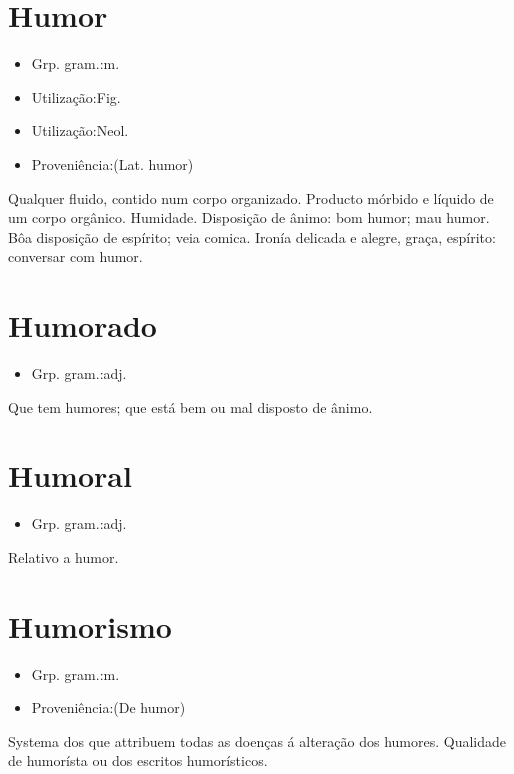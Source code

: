 \documentclass{article}
\begin{document}
\section{Humor}
\begin{itemize}
\item {Grp. gram.:m.}
\end{itemize}
\begin{itemize}
\item {Utilização:Fig.}
\end{itemize}
\begin{itemize}
\item {Utilização:Neol.}
\end{itemize}
\begin{itemize}
\item {Proveniência:(Lat. \textunderscore humor\textunderscore )}
\end{itemize}
Qualquer fluido, contido num corpo organizado.
Producto mórbido e líquido de um corpo orgânico.
Humidade.
Disposição de ânimo: \textunderscore bom humor\textunderscore ; \textunderscore mau humor\textunderscore .
Bôa disposição de espírito; veia comica.
Ironía delicada e alegre, graça, espírito: \textunderscore conversar com humor\textunderscore .
\section{Humorado}
\begin{itemize}
\item {Grp. gram.:adj.}
\end{itemize}
Que tem humores; que está bem ou mal disposto de ânimo.
\section{Humoral}
\begin{itemize}
\item {Grp. gram.:adj.}
\end{itemize}
Relativo a humor.
\section{Humorismo}
\begin{itemize}
\item {Grp. gram.:m.}
\end{itemize}
\begin{itemize}
\item {Proveniência:(De \textunderscore humor\textunderscore )}
\end{itemize}
Systema dos que attribuem todas as doenças á alteração dos humores.
Qualidade de humorísta ou dos escritos humorísticos.
\end{document}

